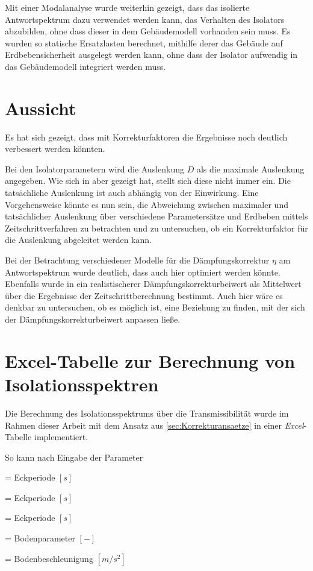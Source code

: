 Mit einer Modalanalyse wurde weiterhin gezeigt, dass das isolierte Antwortspektrum dazu verwendet werden kann, das Verhalten des Isolators abzubilden, ohne dass dieser in dem Gebäudemodell vorhanden sein muss.
Es wurden so statische Ersatzlasten berechnet, mithilfe derer das Gebäude auf Erdbebensicherheit ausgelegt werden kann, ohne dass der Isolator aufwendig in das Gebäudemodell integriert werden muss.

\section{Aussicht}

Es hat sich gezeigt, dass mit Korrekturfaktoren die Ergebnisse noch deutlich verbessert werden könnten.

Bei den Isolatorparametern wird die Auslenkung $D$ als die maximale Auslenkung angegeben. Wie sich in \cite{Isemann} aber gezeigt hat, stellt sich diese nicht immer ein. Die tatsächliche Auslenkung ist auch abhängig von der Einwirkung.
Eine Vorgehensweise könnte es nun sein, die Abweichung zwischen maximaler und tatsächlicher Auslenkung über verschiedene Parametersätze und Erdbeben mittels Zeitschrittverfahren zu betrachten und zu untersuchen, ob ein Korrekturfaktor für die Auslenkung abgeleitet werden kann.

Bei der Betrachtung verschiedener Modelle für die Dämpfungskorrektur $\eta$ am Antwortspektrum wurde deutlich, dass auch hier optimiert werden könnte. Ebenfalls wurde in \cite{Isemann} ein realistischerer Dämpfungskorrekturbeiwert als Mittelwert über die Ergebnisse der Zeitschrittberechnung bestimmt. Auch hier wäre es denkbar zu untersuchen, ob es möglich ist, eine Beziehung zu finden, mit der sich der Dämpfungskorrekturbeiwert anpassen ließe.

\section{Excel-Tabelle zur Berechnung von Isolationsspektren}

Die Berechnung des Isolationsspektrums über die Transmissibilität wurde im Rahmen dieser Arbeit mit dem Ansatz aus \cref{sec:Korrekturansaetze} in einer \emph{Excel}-Tabelle implementiert.

So kann nach Eingabe der Parameter 

  = Eckperiode $[s]$ \par
{}  = Eckperiode $[s]$ \par
{}  = Eckperiode $[s]$ \par
{}    = Bodenparameter $[-]$ \par
{}  = Bodenbeschleunigung $[m/s^2]$ \par

